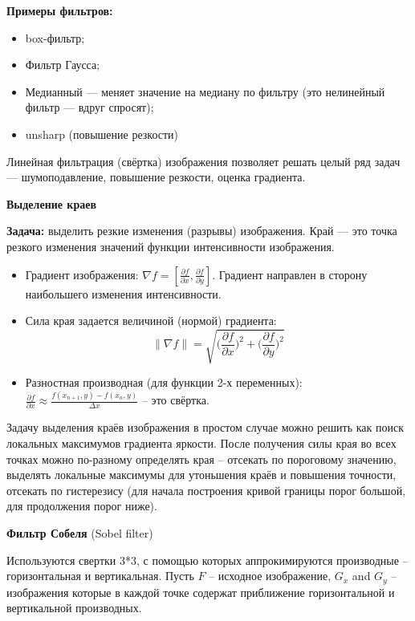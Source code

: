 \textbf{Примеры фильтров:}
\begin{itemize}
    \item box-фильтр;  
    \item Фильтр Гаусса;
    \item Медианный --- меняет значение на медиану по фильтру (это нелинейный фильтр --- вдруг спросят);
    \item unsharp (повышение резкости)
\end{itemize}

Линейная фильтрация (свёртка) изображения позволяет решать целый ряд
задач --- шумоподавление, повышение резкости, оценка градиента. \newline

\textbf{Выделение краев}

\textbf{Задача:} выделить резкие изменения (разрывы) изображения. Край --- это точка резкого изменения значений функции интенсивности изображения.

\begin{itemize}
\item Градиент изображения: $\nabla f = \left[ \frac{\partial f}{\partial x}, \frac{\partial f}{\partial y} \right]$. Градиент направлен в сторону наибольшего изменения интенсивности.
\item Сила края задается величиной (нормой) градиента:
$$  \| \nabla f  \| = \sqrt{\Big(\frac{\partial f}{\partial x}\Big)^2 + \Big(\frac{\partial f}{\partial y}\Big)^2}$$
\item Разностная производная (для функции 2-х переменных):\newline
$\frac{\partial f}{\partial x} \approx \frac{f(x_{n+1},y)-f(x_n,y)}{\Delta x} $ -- это свёртка. 

\end{itemize}

Задачу выделения краёв изображения в простом случае можно решить как поиск локальных максимумов градиента яркости. \newline
После получения силы края во всех точках можно по-разному определять края -- отсекать по пороговому значению, выделять локальные максимумы для утоньшения краёв и повышения точности, отсекать по гистерезису (для начала построения кривой границы порог большой, для продолжения порог ниже).

\textbf{Фильтр Собеля} (Sobel filter)

Используются свертки 3*3, с помощью которых аппрокимируются производные -- горизонтальная и вертикальная. Пусть $F$ -- исходное изображение, $G_x$ and $G_y$ -- изображения которые в каждой точке содержат приближение горизонтальной и вертикальной производных.

